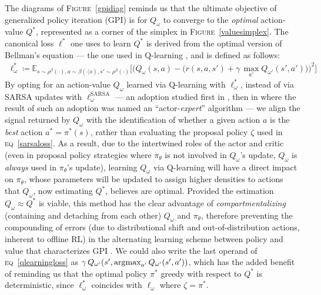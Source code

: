 The diagrams of \textsc{Figure}~\ref{gpidiag} reminds us that the ultimate objective of
generalized policy iteration (GPI) \cite{Sutton1998-ow}
is for $Q_\omega$ to converge to the \emph{optimal} action-value $Q^*$,
represented as a corner of the simplex in \textsc{Figure}~\ref{valuesimplex}.
The canonical loss $\ell^*$ one uses to learn $Q^*$
is derived from the optimal version of Bellman's equation
--- the one used in Q-learning \cite{Watkins1989-ir, Watkins1992-gl},
and is defined as follows:
\begin{align}
  \ell^*_\omega \coloneqq
  \mathbb{E}_{s \sim \rho^\beta(\cdot), a \sim \beta(\cdot | s), s' \sim \rho^\beta(\cdot)}
  \bigg[
  \Big(
  Q_\omega(s,a) -
  \big(
  r(s, a, s') + \gamma \,
  \max_{a'}Q_{\omega'}(s',a')
  \big)
  \Big)^2
  \bigg]
  \label{qlearningloss}
\end{align}
By opting for an action-value $Q_\omega$ learned via Q-learning with $\ell^*_\omega$,
instead of via SARSA updates with $\ell^\text{SARSA}_\omega$
--- an adoption studied first in \cite{Crites1995-hn},
then in \cite{Lim2018-ey}
where the result of such an adoption was named an ``actor-\textit{expert}'' algorithm ---
we align the signal returned by $Q_\omega$ with the identification of whether a given action $a$ is
the \emph{best} action $a^*=\pi^*(s)$,
rather than evaluating the proposal policy $\zeta$ used in
\textsc{eq}~\ref{sarsaloss}.
As a result, due to the intertwined roles of the actor and critic
(even in proposal policy strategies where $\pi_\theta$ is not involved in $Q_\omega$'s update,
$Q_\omega$ is \emph{always} used in $\pi_\theta$'s update),
learning $Q_\omega$ via Q-learning will have a direct impact on $\pi_\theta$,
whose parameters will be updated to assign higher densities to actions that
$Q_\omega$, now estimating $Q^*$, believes are optimal.
Provided the estimation $Q_\omega \approx Q^*$ is viable,
this method has the clear advantage of
\emph{compartmentalizing} (containing and detaching from each other)
$Q_\omega$ and $\pi_\theta$,
therefore preventing the compounding of errors
(due to distributional shift and out-of-distribution actions,
inherent to offline RL)
in the alternating learning scheme
between policy and value that characterizes GPI \cite{Sutton1998-ow}.
We could also write the last operand of \textsc{eq}~\ref{qlearningloss} as
$\gamma \, Q_{\omega'}(s',\operatorname*{\arg\!\max}_{a'}Q_{\omega'}(s',a'))$,
which has the added benefit of reminding us that the optimal policy $\pi^*$ greedy with respect to $Q^*$
is deterministic, since $\ell^*_\omega$ coincides with $\ell_\omega$ where $\zeta = \pi^*$.
